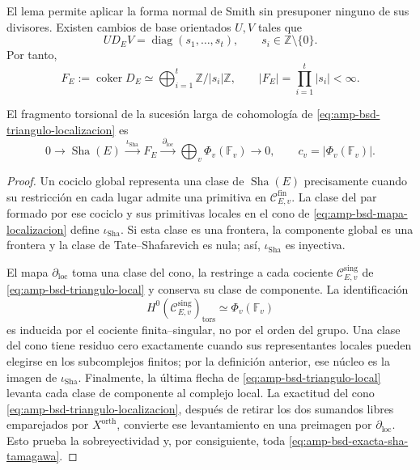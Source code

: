 El lema permite aplicar la forma normal de Smith sin presuponer ninguno de
sus divisores. Existen cambios de base orientados \(U,V\) tales que
\begin{equation}\label{eq:amp-bsd-morfismo-smith}
 U D_E V=\operatorname{diag}(s_1,\ldots,s_t),
 \qquad s_i\in\mathbb Z\setminus\{0\}.
\end{equation}
Por tanto,
\begin{equation}\label{eq:amp-bsd-grupo-smith}
 F_E:=\operatorname{coker}D_E
 \simeq\bigoplus_{i=1}^{t}\mathbb Z/|s_i|\mathbb Z,
 \qquad
 |F_E|=\prod_{i=1}^{t}|s_i|<\infty.
\end{equation}

\begin{lemma}
\label{lem:amp-bsd-exactitud-sha-tamagawa}
El fragmento torsional de la sucesión larga de cohomología de
\eqref{eq:amp-bsd-triangulo-localizacion} es
\begin{equation}\label{eq:amp-bsd-exacta-sha-tamagawa}
 0\longrightarrow\operatorname{Sha}(E)
 \xrightarrow{\ \iota_{\mathrm{Sha}}\ }F_E
 \xrightarrow{\ \partial_{\mathrm{loc}}\ }
 \bigoplus_v\Phi_v(\mathbb F_v)
 \longrightarrow0,
 \qquad c_v=|\Phi_v(\mathbb F_v)|.
\end{equation}
\end{lemma}

\begin{proof}
Un cociclo global representa una clase de
\(\operatorname{Sha}(E)\) precisamente cuando su restricción en cada lugar
admite una primitiva en
\(\mathcal C_{E,v}^{\mathrm{fin}}\). La clase del par formado por ese
cociclo y sus primitivas locales en el cono de
\eqref{eq:amp-bsd-mapa-localizacion} define
\(\iota_{\mathrm{Sha}}\). Si esta clase es una frontera, la componente global es una
frontera y la clase de Tate--Shafarevich es nula; así,
\(\iota_{\mathrm{Sha}}\) es inyectiva.

El mapa \(\partial_{\mathrm{loc}}\) toma una clase del cono, la restringe a
cada cociente
\(\mathcal C_{E,v}^{\mathrm{sing}}\) de
\eqref{eq:amp-bsd-triangulo-local} y conserva su clase de componente. La
identificación
\[
 H^0(\mathcal C_{E,v}^{\mathrm{sing}})_{\mathrm{tors}}
 \simeq\Phi_v(\mathbb F_v)
\]
es inducida por el cociente finita--singular, no por el orden del grupo.
Una clase del cono tiene residuo cero exactamente cuando sus representantes
locales pueden elegirse en los subcomplejos finitos; por la definición
anterior, ese núcleo es la imagen de \(\iota_{\mathrm{Sha}}\).
Finalmente, la última flecha de
\eqref{eq:amp-bsd-triangulo-local} levanta cada clase de componente al
complejo local. La exactitud del cono
\eqref{eq:amp-bsd-triangulo-localizacion}, después de retirar los dos
sumandos libres emparejados por \(X^{\mathrm{orth}}\), convierte ese
levantamiento en una preimagen por \(\partial_{\mathrm{loc}}\). Esto prueba
la sobreyectividad y, por consiguiente, toda
\eqref{eq:amp-bsd-exacta-sha-tamagawa}.
\end{proof}

